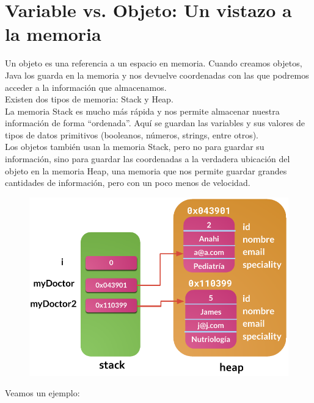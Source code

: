 \documentclass{article}
\begin{document}
\section{Variable vs. Objeto: Un vistazo a la memoria}%
Un objeto es una referencia a un espacio en memoria. Cuando creamos objetos,
Java los guarda en la memoria y nos devuelve coordenadas con las que podremos
acceder a la información que almacenamos.\\

Existen dos tipos de memoria: Stack y Heap.\\

La memoria Stack es mucho más rápida y nos permite almacenar nuestra
información de forma “ordenada”. Aquí se guardan las variables y sus valores de
tipos de datos primitivos (booleanos, números, strings, entre otros).\\

Los objetos también usan la memoria Stack, pero no para guardar su información,
sino para guardar las coordenadas a la verdadera ubicación del objeto en la
memoria Heap, una memoria que nos permite guardar grandes cantidades de
información, pero con un poco menos de velocidad.\\

\begin{figure}[h!]
  \centering
  \includegraphics[scale=0.5]{./Pictures/027_var_vs_objeto.png}
\end{figure}

Veamos un ejemplo:
\end{document}
